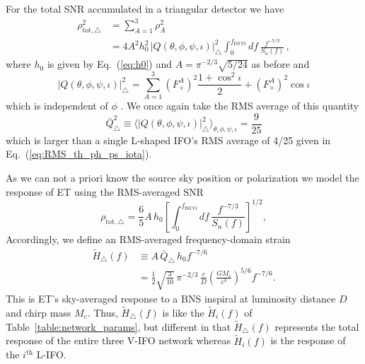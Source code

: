 \documentclass[prd,amsmath,amssymb,aps,floats,amsfonts,notitlepage,superscriptaddress,eqsecnum,nofootinbib,10pt]{revtex4-1}
\newcommand{\nn}{\nonumber}
\newcommand{\f}{\frac}
\newcommand{\be}{\begin{equation}}
\newcommand{\ee}{\end{equation}}
\begin{document}
For the total SNR accumulated in a triangular detector we have
%
\begin{align}
\rho^2_{\text{tot},\bigtriangleup} & = \sum_{A=1}^3 \rho_A^2 \nn \\ %
 & =  4 A^2 h_0^2\,|Q(\theta,\phi,\psi,\iota)|_\bigtriangleup^2 \int_0^{f_\text{ISCO}} d f\, \f{f^{-7/3}}{S_n(f)} \, ,\label{eq:ET_SNRsq}
\end{align}
where $h_0$ is given by Eq.~(\ref{eq:h0}) and $A=\pi^{-2/3}\sqrt{5/24}$ as before and
%
\be
|Q(\theta,\phi,\psi,\iota)|_\bigtriangleup^2 = \sum_{A=1}^3 \left(F^A_+\right)^2\f{1+\cos^2\iota}{2}  + \left(F^A_\times\right)^2 \cos\iota \label{eq:Q_sq_ET}
\ee
%
which is independent of $\phi$ \cite{Regimbau:2012ir}. We once again take the RMS average of this quantity
%
\be
\bar{Q}^2_\bigtriangleup\equiv\langle |Q(\theta,\phi,\psi,\iota)|_\bigtriangleup^2 \rangle_{\theta,\phi,\psi,\iota} = \f{9}{25}\label{eq:RMS_ET}
\ee
%
which is larger than a single L-shaped IFO's RMS average of 4/25 given in Eq.~(\ref{eq:RMS_th_ph_ps_iota}).

As we can not a priori know the source sky position or polarization we model the response of ET using the RMS-averaged SNR %
%
\be
\rho_{\text{tot},\bigtriangleup} = \f{6}{5}A\, h_0 \left[\int_0^{f_\text{ISCO}} d f\, \f{f^{-7/3}}{S_n(f)}\right]^{1/2} \label{eq:ET_SNR},
\ee
Accordingly, we define an RMS-averaged frequency-domain strain
%
\begin{align}
\tilde{H}_\bigtriangleup(f)&\equiv A\,  \bar{Q}_\bigtriangleup\, h_0 f^{-7/6} \nn \\
   & = \f{1}{2}\sqrt{\f{3}{10}}\,{\pi^{-2/3}}\, \f{c}{D}\left(\f{G M_c}{c^3}\right)^{5/6} f^{-7/6}. \label{eq:H_delta}
\end{align}
%
This is ET's sky-averaged response to a BNS inspiral at luminosity distance $D$ and chirp mass $M_c$.
Thus, $\tilde{H}_\bigtriangleup(f)$ is like the $\tilde{H}_i(f)$ of Table~\ref{table:network_params},
but different in that  $\tilde{H}_\bigtriangleup(f)$ represents the total response of the entire three V-IFO network whereas $\tilde{H}_i(f)$
is the response of the $i^\text{th}$ L-IFO.
\end{document}
